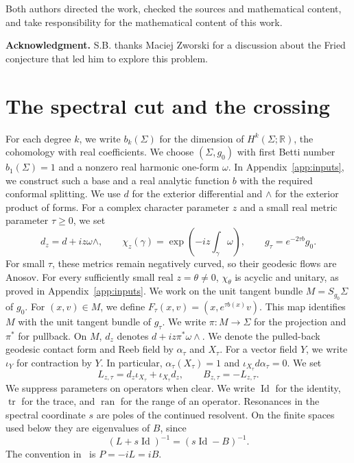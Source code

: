 \documentclass[11pt,letterpaper,reqno]{amsart}
\theoremstyle{remark}
\newcommand{\Id}{\operatorname{Id}}
\newcommand{\tr}{\operatorname{tr}}
\newcommand{\ran}{\operatorname{ran}}
\begin{document}
Both authors directed the work, checked the sources and mathematical content, and take responsibility for
the mathematical content of this work. 


\noindent\textbf{Acknowledgment.} S.B. thanks Maciej Zworski for a
discussion about the Fried conjecture that led him to explore this problem. 


\section{The spectral cut and the crossing}\label{sec:spectral}
For each degree $k$, we write $b_k(\Sigma)$ for the dimension of
$H^k(\Sigma;\mathbb R)$, the cohomology with real coefficients.
We choose $(\Sigma,g_0)$ with first Betti number $b_1(\Sigma)=1$ and a
nonzero real harmonic one-form $\omega$. In Appendix~\ref{app:inputs},
we construct such a base and a real analytic function $b$ with the
required conformal splitting. We use $d$ for the exterior differential
and $\wedge$ for the exterior product of forms. For a complex
character parameter $z$ and a small real metric parameter
$\tau\geq0$, we set
\[
 d_z=d+iz\omega\wedge,\qquad
 \chi_z(\gamma)=\exp\left(-iz\int_\gamma\omega\right),\qquad
 g_\tau=e^{-2\tau b}g_0.
\]
For small $\tau$, these metrics remain negatively curved, so their
geodesic flows are Anosov.
For every sufficiently small real $z=\theta\ne0$, $\chi_\theta$
is acyclic and unitary, as proved in Appendix~\ref{app:inputs}.
We work on the unit tangent bundle $M=S_{g_0}\Sigma$ of $g_0$.
For $(x,v)\in M$, we define $F_\tau(x,v)=(x,e^{\tau b(x)}v)$.
This map identifies $M$ with the unit tangent bundle of $g_\tau$.
We write $\pi:M\to\Sigma$ for the projection and $\pi^*$ for pullback.
On $M$, $d_z$ denotes $d+iz\pi^*\omega\wedge$.
We denote the pulled-back geodesic contact form and Reeb field by
$\alpha_\tau$ and $X_\tau$. For a vector field $Y$, we write $\iota_Y$ for
contraction by $Y$. In particular,
$\alpha_\tau(X_\tau)=1$ and $\iota_{X_\tau}d\alpha_\tau=0$.
We set
\[
 L_{z,\tau}=d_z\iota_{X_\tau}+\iota_{X_\tau}d_z,
 \qquad B_{z,\tau}=-L_{z,\tau}.
\]
We suppress parameters on operators when clear. We write $\Id$ for the
identity, $\tr$ for the trace, and $\ran$ for the range of an operator.
Resonances in the spectral
coordinate $s$ are poles of the continued resolvent. On the finite
spaces used below they are eigenvalues of $B$, since
\[
 (L+s\Id)^{-1}=(s\Id-B)^{-1}.
\]
The convention in~\cite{CDDP} is $P=-iL=iB$.
\end{document}
